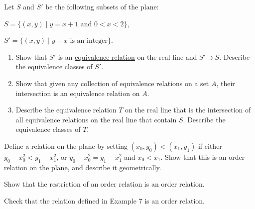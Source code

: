   \begin{exercise}[Munkres 3.5]
    Let $S$ and $S'$ be the following subsets of the plane:

    $S = \{(x, y) \mid y = x + 1 \text{ and } 0 < x < 2\}$,

    $S' = \{(x, y) \mid y - x \text{ is an integer}\}$.
    \begin{enumerate}
      \item Show that $S'$ is an \hyperref[def:equivalence_relation]{equivalence relation} on the real line and $S' \supset S$. Describe the equivalence classes of $S'$.
      \item Show that given any collection of equivalence relations on a set $A$, their intersection is an equivalence relation on $A$.
      \item Describe the equivalence relation $T$ on the real line that is the intersection of all equivalence relations on the real line that contain $S$. Describe the equivalence classes of $T$.
    \end{enumerate}
  \end{exercise}
  \begin{solution}
    
  \end{solution}

  \begin{exercise}[Munkres 3.6]
    Define a relation on the plane by setting $(x_0, y_0) < (x_1, y_1)$ if either $y_0 - x_0^2 < y_1 - x_1^2$, or $y_0 - x_0^2 = y_1 - x_1^2$ and $x_0 < x_1$. Show that this is an order relation on the plane, and describe it geometrically.
  \end{exercise}
  \begin{solution}
    
  \end{solution}

  \begin{exercise}[Munkres 3.7]
    Show that the restriction of an order relation is an order relation.
  \end{exercise}
  \begin{solution}
    
  \end{solution}

  \begin{exercise}[Munkres 3.8]
    Check that the relation defined in Example 7 is an order relation.
  \end{exercise}
  \begin{solution}
    
  \end{solution}

